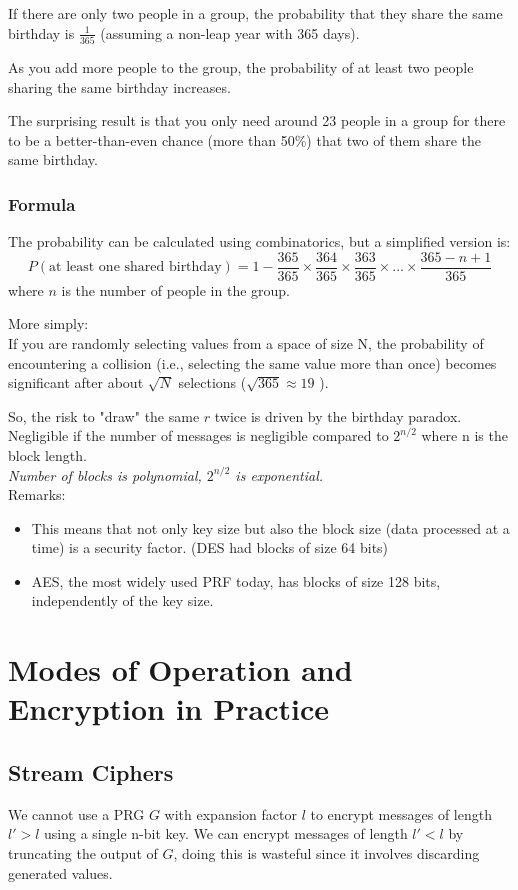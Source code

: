 \documentclass[12pt]{article}
\begin{document}
If there are only two people in a group, the probability that they share the same birthday is $\frac{1}{365}$ (assuming a non-leap year with 365 days).

As you add more people to the group, the probability of at least two people sharing the same birthday increases.

The surprising result is that you only need around 23 people in a group for there to be a better-than-even chance (more than 50\%) that two of them share the same birthday.

\subsubsection*{Formula}

The probability can be calculated using combinatorics, but a simplified version is:
\[
P(\text{{at least one shared birthday}}) = 1 - \frac{365}{365} \times \frac{364}{365} \times \frac{363}{365} \times \ldots \times \frac{365 - n + 1}{365}
\]
where \( n \) is the number of people in the group.

More simply:\\
 If you are randomly selecting values from a space of size N, the probability of encountering a collision (i.e., selecting the same value more than once) becomes significant after about $\sqrt{N}$ selections ($\sqrt{365} \approx 19$ ).
 
 So, the risk to "draw" the same $r$ twice is driven by the birthday paradox. Negligible if the number of messages is negligible compared to $2^{n/2}$ where n is the block length.\\
 \emph{Number of blocks is polynomial, $2^{n/2}$ is exponential.}\\
 Remarks:
 \begin{itemize}
\item This means that not only key size but also the block size (data processed at a time) is a security factor. (DES had blocks of size 64 bits)
\item AES, the most widely used PRF today, has blocks of size 128 bits, independently of the key size.
\end{itemize}
\newpage
 
\section{Modes of Operation and Encryption in Practice}
\subsection{Stream Ciphers}
We cannot use a PRG $G$ with expansion factor $l$ to encrypt messages of length $l' > l$ using a single n-bit key. We can encrypt messages of length $l' < l $ by truncating the output of $G$, doing this is wasteful since it involves discarding generated values.
\end{document}
